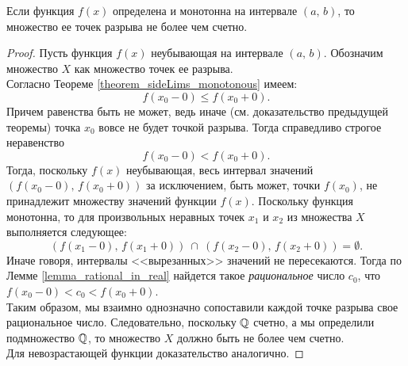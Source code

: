 \begin{theorem}
Если функция \(f(x)\) определена и монотонна на интервале \((a, \, b)\),
то множество ее точек разрыва не более чем счетно.

\begin{proof}
Пусть функция \(f(x)\) неубывающая на интервале \((a, \, b)\).
Обозначим множество \(X\) как множество точек ее разрыва. \\
Согласно Теореме \ref{theorem_sideLims_monotonous} имеем:
\[
f(x_{0} - 0) \leq f(x_{0} + 0).
\]
Причем равенства быть не может, ведь иначе (см. доказательство предыдущей теоремы)
точка \(x_{0}\) вовсе не будет точкой разрыва. Тогда справедливо строгое неравенство
\[
f(x_{0} - 0) < f(x_{0} + 0).
\]
Тогда, поскольку \(f(x)\) неубывающая, весь интервал значений \((f(x_{0} - 0), \, f(x_{0} + 0))\)
за исключением, быть может, точки \(f(x_{0})\), не принадлежит множеству значений функции \(f(x)\).
Поскольку функция монотонна, то для произвольных неравных точек \(x_{1}\) и \(x_{2}\)
из множества \(X\) выполняется следующее:
\[
(f(x_{1} - 0), \, f(x_{1} + 0)) ~ \cap ~ (f(x_{2} - 0), \, f(x_{2} + 0)) = \emptyset.
\]
Иначе говоря, интервалы <<вырезанных>> значений не пересекаются.
Тогда по Лемме \ref{lemma_rational_in_real} найдется такое \textit{рациональное}
число \(c_{0}\), что \(f(x_{0} - 0) < c_{0} < f(x_{0} + 0)\). \\
Таким образом, мы взаимно однозначно сопоставили каждой точке разрыва свое рациональное число.
Следовательно, поскольку \(\mathbb{Q}\) счетно, а мы определили подмножество \(\mathbb{Q}\),
то множество \(X\) должно быть не более чем счетно.\\
Для невозрастающей функции доказательство аналогично.
\end{proof}
\end{theorem}

